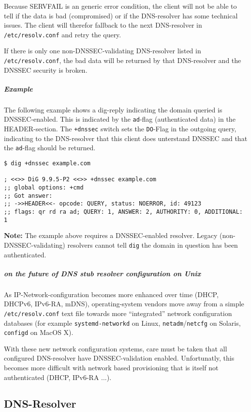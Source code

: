 Because SERVFAIL is an generic error condition, the client will not be
able to tell if the data is bad (compromised) or if the DNS-resolver
has some technical issues. The client will therefor fallback to the
next DNS-resolver in \verb|/etc/resolv.conf| and retry the query.

If there is only one non-DNSSEC-validating DNS-resolver listed in
\verb|/etc/resolv.conf|, the bad data will be returned by that
DNS-resolver and the DNSSEC security is broken.

\subparagraph{Example}

The following example shows a dig-reply indicating the domain queried is
DNSSEC-enabled. This is indicated by the \verb|ad|-flag (authenticated data) in
the HEADER-section. The \verb|+dnssec| switch sets the \verb|DO|-Flag
in the outgoing query, indicating to the DNS-resolver that this client
does unterstand DNSSEC and that the \verb|ad|-flag should be returned.

\begin{lstlisting}
$ dig +dnssec example.com

; <<>> DiG 9.9.5-P2 <<>> +dnssec example.com
;; global options: +cmd
;; Got answer:
;; ->>HEADER<<- opcode: QUERY, status: NOERROR, id: 49123
;; flags: qr rd ra ad; QUERY: 1, ANSWER: 2, AUTHORITY: 0, ADDITIONAL: 1
\end{lstlisting}

\textbf{Note:} The example above requires a DNSSEC-enabled
resolver. Legacy (non-DNSSEC-validating) resolvers cannot tell
\verb|dig| the domain in question has been authenticated.

\subparagraph{on the future of DNS stub resolver configuration on
  Unix}

As IP-Network-configuration becomes more enhanced over time (DHCP,
DHCPv6, IPv6-RA, mDNS), operating-system vendors move away from a
simple \verb|/etc/resolv.conf| text file towards more ``integrated''
network configuration databases (for example \verb|systemd-networkd|
on Linux, \verb|netadm|/\verb|netcfg| on Solaris, \verb|configd| on
MacOS X).

With these new network configuration systems, care must be taken that
all configured DNS-resolver have DNSSEC-validation
enabled. Unfortunatly, this becomes more difficult with network based
provisioning that is itself not authenticated (DHCP, IPv6-RA ...).

\subsection{DNS-Resolver}

